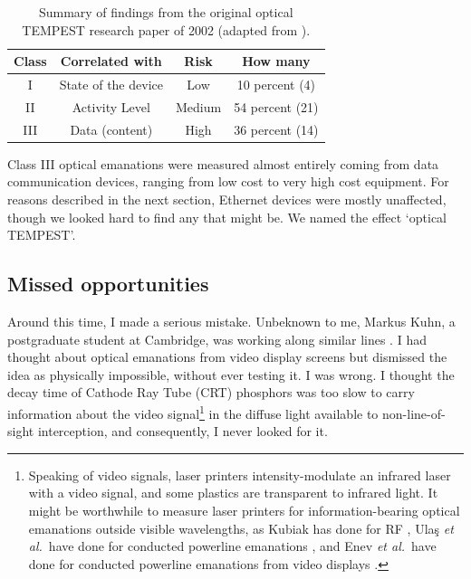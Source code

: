 \documentclass[conference]{IEEEtran}
\begin{document}
\begin{table}[!t]
    \renewcommand{\arraystretch}{1.3}
    \caption{Summary of findings from the original optical TEMPEST research
        paper of 2002 (adapted from \cite[Tables I and II]{Loughry2002a}).}
    \label{table:optical_tempest_findings}
    \centering
    \begin{tabular}{|c|c|c|c|}
        \hline
        Class & Correlated with & Risk & How many \\
        \hline
        I & State of the device & Low & 10 percent (4) \\
        II & Activity Level & Medium & 54 percent (21) \\
        III & Data (content) & High & 36 percent (14) \\
        \hline
    \end{tabular}
\end{table}

Class III optical emanations were measured almost entirely coming from data
communication devices, ranging from low cost to very high cost equipment. For
reasons described in the next section, Ethernet devices were mostly
unaffected, though we looked hard to find any that might be. We named the
effect `optical TEMPEST'.

\subsection{Missed opportunities}

Around this time, I made a serious mistake. Unbeknown to me, Markus Kuhn, a
postgraduate student at Cambridge, was working along similar lines
\cite{Kuhn2003}. I had
thought about optical emanations from video display screens but dismissed the
idea as physically impossible, without ever testing it. I was wrong. I
thought the decay time of Cathode Ray Tube (CRT) phosphors was too slow to
carry information about the video signal\footnote{Speaking of video signals,
laser printers intensity-modulate an infrared laser with a video signal, and
some plastics are transparent to infrared light. It might be worthwhile to
measure laser printers for information-bearing optical emanations outside
visible wavelengths, as Kubiak has done for RF
\cite{Kubiak2014a,Kubiak2017b,Kubiak2017c,Kubiak2017d}, Ula\c{s} {\it et al.}\
have done for conducted powerline emanations \cite{Ulas2016}, and Enev {\it
et al.}\ have done for conducted powerline emanations from video displays
\cite{Enev2011}.} in the diffuse light available to non-line-of-sight
interception, and consequently, I never looked for it.
\end{document}

